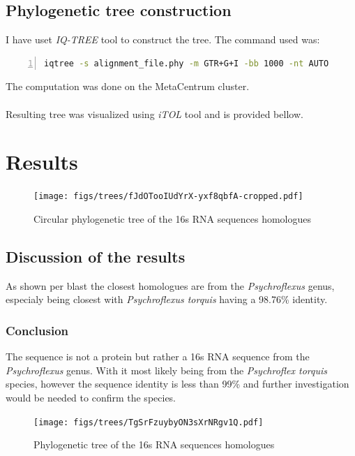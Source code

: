 \documentclass{article}
\begin{document}
\subsection{Phylogenetic tree construction}

I have uset \textit{IQ-TREE} tool to construct the tree. The command used was:

\begin{lstlisting}[language=Bash, basicstyle=\ttfamily\small, keywordstyle=\color{blue}, stringstyle=\color{red}, commentstyle=\color{green}, showstringspaces=false, numbers=left, numberstyle=\tiny\color{gray}, breaklines=true, frame=single, inputencoding=utf8]
    iqtree -s alignment_file.phy -m GTR+G+I -bb 1000 -nt AUTO
\end{lstlisting}

The computation was done on the MetaCentrum cluster.
\\
\\
Resulting tree was visualized using \textit{iTOL} tool and is provided bellow.

\section{Results}

\begin{figure}[H]
    \centering
    \texttt{[image: figs/trees/fJdOTooIUdYrX-yxf8qbfA-cropped.pdf]}
    \caption{Circular phylogenetic tree of the 16s RNA sequences homologues}
    \label{fig:circular_phylogenetic_tree}
\end{figure}


\subsection{Discussion of the results}
As shown per blast the closest homologues are from the \textit{Psychroflexus} genus, especialy being closest with \textit{Psychroflexus torquis} having a 98.76\% identity.

\subsubsection{Conclusion}
The sequence is not a protein but rather a 16s RNA sequence from the \textit{Psychroflexus} genus. With it most likely being from the \textit{Psychroflex torquis} species, however the sequence identity is less than 99\% and further investigation would be needed to confirm the species.

\begin{figure}[H]
    \centering
    \texttt{[image: figs/trees/TgSrFzuybyON3sXrNRgv1Q.pdf]}
    \caption{Phylogenetic tree of the 16s RNA sequences homologues}
    \label{fig:phylogenetic_tree}
\end{figure}
\end{document}
